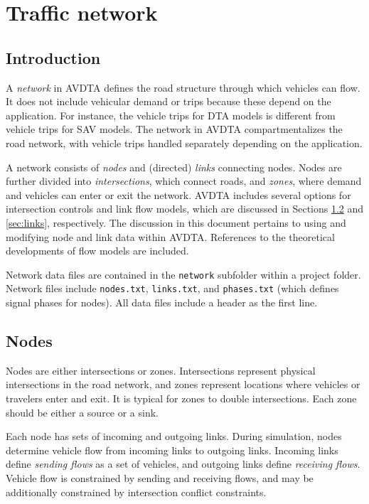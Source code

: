 \chapter{Traffic network}
\label{sec:network}


\section{Introduction}
A \textit{network} in AVDTA defines the road structure through which vehicles can flow. It does not include vehicular demand or trips because these depend on the application. For instance, the vehicle trips for DTA models is different from vehicle trips for SAV models. The network in AVDTA compartmentalizes the road network, with vehicle trips handled separately depending on the application.

A network consists of \textit{nodes} and (directed) \textit{links} connecting nodes. Nodes are further divided into \textit{intersections}, which connect roads, and \textit{zones}, where demand and vehicles can enter or exit the network. AVDTA includes several options for intersection controls and link flow models, which are discussed in Sections \ref{sec:nodes} and \ref{sec:links}, respectively. The discussion in this document pertains to using and modifying node and link data within AVDTA. References to the theoretical developments of flow models are included.

Network data files are contained in the \texttt{network} subfolder within a project folder. Network files include \texttt{nodes.txt}, \texttt{links.txt}, and \texttt{phases.txt} (which defines signal phases for nodes). All data files include a header as the first line. 

\section{Nodes}
\label{sec:nodes}

Nodes are either intersections or zones. Intersections represent physical intersections in the road network, and zones represent locations where vehicles or travelers enter and exit. It is typical for zones to double intersections. Each zone should be either a source or a sink.

Each node has sets of incoming and outgoing links. During simulation, nodes determine vehicle flow from incoming links to outgoing links. Incoming links define \textit{sending flows} as a set of vehicles, and outgoing links define \textit{receiving flows}. Vehicle flow is constrained by sending and receiving flows, and may be additionally constrained by intersection conflict constraints. 

